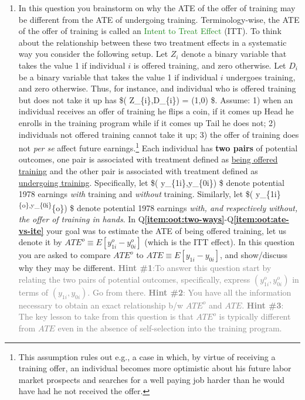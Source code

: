 \documentclass[
]{article}
\providecommand{\tightlist}{%
  \setlength{\itemsep}{0pt}\setlength{\parskip}{0pt}}
\begin{document}
\begin{enumerate}
\def\labelenumi{\arabic{enumi}.}
\setcounter{enumi}{3}
\tightlist
\item
  In this question you brainstorm on why the ATE of the offer of
  training may be different from the ATE of undergoing training.
  Terminology-wise, the ATE of the offer of training is called an
  \textcolor{ForestGreen}{Intent to Treat Effect} (ITT). To think about
  the relationship between these two treatment effects in a systematic
  way you consider the following setup. Let \(Z_{i}\) denote a binary
  variable that takes the value 1 if individual \(i\) is offered
  training, and zero otherwise. Let \(D_{i}\) be a binary variable that
  takes the value 1 if individual \(i\) undergoes training, and zero
  otherwise. Thus, for instance, and individual who is offered training
  but does not take it up has \$( Z\_\{i\},D\_\{i\}) = (1,0) \$. Assume:
  1) when an individual receives an offer of training he flips a coin,
  if it comes up Head he enrolls in the training program while if it
  comes up Tail he does not; 2) individuals not offered training cannot
  take it up; 3) the offer of training does not \textit{per se} affect
  future
  earnings.\footnote{This assumption rules out e.g., a case in which, by virtue of receiving a training offer, an individual becomes more optimistic about his future labor market prospects and searches for a well paying job harder than he would have had he not received the offer.}
  Each individual has \textbf{two pairs} of potential outcomes, one pair
  is associated with treatment defined as
  \underline{being offered training} and the other pair is associated
  with treatment defined as \underline{undergoing training}.
  Specifically, let \$( y\_\{1i\},y\_\{0i\}) \$ denote potential 1978
  earnings \textit{with} training and \textit{without} training.
  Similarly, let \$( y\_\{1i\}\textsuperscript{\{o\},y\_\{0i\}}\{o\}) \$
  denote potential 1978 earnings
  \textit{with, and respectively without, the offer of training in hands}.
  In
  Q\textbf{\ref{item:oot:two-ways}}-Q\textbf{\ref{item:oot:ate-vs-ite}}
  your goal was to estimate the ATE of being offered training, let us
  denote it by \(ATE^{o}\equiv E[ y_{1i}^{o}-y_{0i}^{o}]\) (which is the
  ITT effect). In this question you are asked to compare \(ATE^{o}\) to
  \(ATE\equiv E[ y_{1i}-y_{0i}]\), and show/discuss why they may be
  different.
  \textcolor{gray}{\textbf{Hint \#1}:To answer this question start by relating the two pairs of potential outcomes, specifically, express $( y_{1i}^{o},y_{0i}^{o})$ in terms of $( y_{1i},y_{0i})$. Go from there. \textbf{Hint \#2}: You have all the information necessary to obtain an exact relationship b/w $ATE^{o}$ and $ATE$. \textbf{Hint \#3}: The key lesson to take from this question is that $ATE^{o}$ is typically different from $ATE$ even in the absence of self-selection into the training program.}
\end{enumerate}
\end{document}
